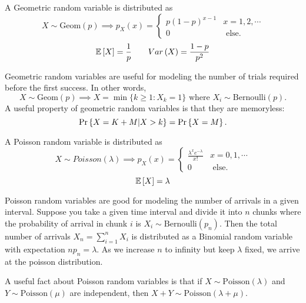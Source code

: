 \begin{definition}
  A Geometric random variable is distributed as
  \[
	X\sim\text{Geom}(p) \implies p_X(x) = \begin{cases}
	  p(1-p)^{x-1} & x=1, 2, \cdots\\
	  0 & \text{ else}.
	\end{cases}
  \]
  \[
	\mathbb{E}\left[X\right] = \frac{1}{p} \qquad Var\left(X\right) = \frac{1-p}{p^2}
  \]
  \label{defn:geometric}
\end{definition}
Geometric random variables are useful for modeling the number of trials required before the first success.
In other words,
\[
  X \sim \text{Geom}(p) \implies X = \min\{k \geq 1: X_k=1 \} \text{ where } X_i\sim \text{Bernoulli}(p).
\]
A useful property of geometric random variables is that they are memoryless:
\[
  \text{Pr}\left\{X=K+M|X>k\right\} = \text{Pr}\left\{X=M\right\}.
\]
\begin{definition}
  A Poisson random variable is distributed as
  \[
	X\sim Poisson(\lambda) \implies p_X(x) = \begin{cases}
	  \frac{\lambda^xe^{-\lambda}}{x!} & x=0, 1, \cdots \\
	  0 & \text{ else.}
	\end{cases}
  \]
  \[
	\mathbb{E}\left[X\right] = \lambda
  \]
  \label{defn:poisson}
\end{definition}
Poisson random variables are good for modeling the number of arrivals in a given interval.
Suppose you take a given time interval and divide it into $n$ chunks where the probability of arrival in chunk $i$ is $X_i \sim \text{Bernoulli}(p_n)$.
Then the total number of arrivals $X_n = \sum_{i=1}^{n}X_i$ is distributed as a Binomial random variable with expectation $np_n=\lambda$.
As we increase $n$ to infinity but keep $\lambda$ fixed, we arrive at the poisson distribution.

A useful fact about Poisson random variables is that if $X\sim\text{Poisson}(\lambda)$ and $Y\sim\text{Poisson}(\mu)$ are independent, then $X+Y \sim \text{Poisson}(\lambda + \mu)$.

